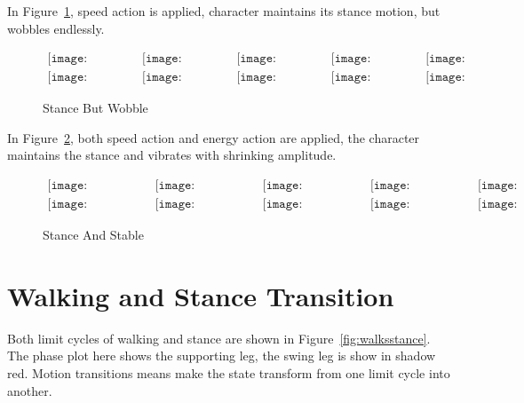 In Figure~\ref{fig:stancespeed}, speed action is applied, character maintains its stance motion, but wobbles endlessly.
\begin{figure}[!htbp]
  \begin{center}
  $
     \begin{array}{ccccc}
\texttt{[image: stancewobble/0001.eps]}&
\texttt{[image: stancewobble/0021.eps]}&
\texttt{[image: stancewobble/0041.eps]}&
\texttt{[image: stancewobble/0061.eps]}&
\texttt{[image: stancewobble/0081.eps]}
\\
\texttt{[image: stancewobble/0101.eps]}&
\texttt{[image: stancewobble/0121.eps]}&
\texttt{[image: stancewobble/0141.eps]}&
\texttt{[image: stancewobble/0161.eps]}&
\texttt{[image: stancewobble/0181.eps]}

\end{array}$
    \caption{Stance But Wobble}
    \label{fig:stancespeed}
\end{center}
\end{figure}

In Figure~\ref{fig:fastconverge}, both speed action and energy action are applied, the character maintains the stance and  vibrates with shrinking amplitude.
\begin{figure}[!htbp]
  \begin{center}
        $\begin{array}{ccccc}
\texttt{[image: stanceconverge/0001.eps]}&
\texttt{[image: stanceconverge/0021.eps]}&
\texttt{[image: stanceconverge/0041.eps]}&
\texttt{[image: stanceconverge/0061.eps]}&
\texttt{[image: stanceconverge/0081.eps]}
\\
\texttt{[image: stanceconverge/0101.eps]}&
\texttt{[image: stanceconverge/0121.eps]}&
\texttt{[image: stanceconverge/0141.eps]}&
\texttt{[image: stanceconverge/0161.eps]}&
\texttt{[image: stanceconverge/0181.eps]}

\end{array}$
    \caption{Stance And Stable}
    \label{fig:fastconverge}
\end{center}
\end{figure}




\section{Walking and Stance Transition}
\label{sec:transmotion}
Both limit cycles of walking and stance are shown in Figure~\ref{fig:walksstance}.
The phase plot here shows the supporting leg, the swing leg is show in shadow red.
Motion transitions means make the state transform from one limit cycle into another.





